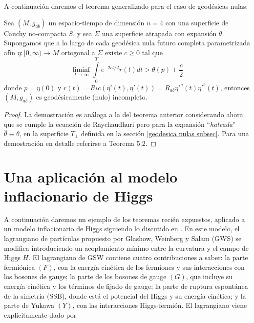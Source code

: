 A continuación daremos el teorema generalizado para el caso de geodésicas nulas.


\begin{theorem}
Sea $(M,g_{ab})$ un espacio-tiempo de dimensión $n=4$ con una superficie de Cauchy no-compacta $S$, y sea $\Sigma$ una superficie atrapada con expansión $\theta$. Supongamos que a lo largo de cada geodésica nula futuro completa parametrizada afín $\eta:[0,\infty)\rightarrow M$ ortogonal a $\Sigma$ existe $c\geq 0$ tal que 
$$
\liminf_{T\to \infty}\int\limits_0^T e^{-2ct/2}r(t)dt > \theta(p) + \frac{c}{2}
$$
donde $p=\eta(0)$ y $r(t)=Ric(\eta'(t),\eta'(t))=R_{ab}\eta'^a(t)\eta'^b(t)$, entonces $(M,g_{ab})$ es geodésicamente (nulo) incompleto.
\end{theorem}
\begin{proof}
La demostración es análoga a la del teorema anterior considerando ahora que se cumple la ecuación de Raychaudhuri pero para la expansión ``\textit{hateada}" $\hat{\theta}\equiv\theta$, en la superficie $T_\perp$ definida en la sección \ref{geodesica nulas subsec}. Para una demostración en detalle referirse a \citep{2011CQGra..28l5009F} Teorema 5.2.
\end{proof}






\section{Una aplicación al modelo inflacionario de Higgs}\label{Higgs}


A continuación daremos un ejemplo de los teoremas recién expuestos, aplicado a un modelo inflacionario de Higgs siguiendo lo discutido en \citep{2009PhRvD..79f3531G}. En este modelo, el lagrangiano de partículas propuesto por Glashow, Weinberg y Salam (GWS) \citep{1961NucPh..22..579G,1967PhRvL..19.1264W,Salam} se modifica introduciendo un acoplamiento mínimo entre la curvatura y el campo de Higgs $H$. El lagrangiano de GSW contiene cuatro contribuciones a saber: la parte fermiónica $(F)$, con la energía cinética de los fermiones y sus interacciones con los bosones de gauge; la parte de los bosones de gauge $(G)$, que incluye su energía cinética y los términos de fijado de gauge; la parte de ruptura espontánea de la simetría (SSB), donde está el potencial del Higgs y su energía cinética; y la parte de Yukawa $(Y)$, con las interacciones Higgs-fermión. El lagrangiano viene explícitamente dado por



